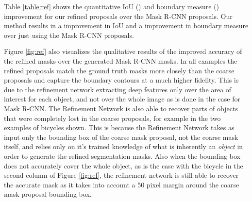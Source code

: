 \documentclass[runningheads]{llncs}
\begin{document}
Table \ref{table:ref} shows the quantitative IoU () and boundary measure () improvement for our refined proposals over the Mask R-CNN proposals. Our method results in a  improvement in IoU and a  improvement in boundary measure over just using the Mask R-CNN proposals.

Figure \ref{fig:ref} also visualizes the qualitative results of the improved accuracy of the refined masks over the generated Mask R-CNN masks. In all examples the refined proposals match the ground truth masks more closely than the coarse proposals and capture the boundary contours at a much higher fidelity. This is due to the refinement network extracting deep features only over the area of interest for each object, and not over the whole image as is done in the case for Mask R-CNN. The Refinement Network is also able to recover parts of objects that were completely lost in the coarse proposals, for example in the two examples of bicycles shown. This is because the Refinement Network takes as input only the bounding box of the coarse mask proposal, not the coarse mask itself, and relies only on it's trained knowledge of what is inherently an \textit{object} in order to generate the refined segmentation masks. Also when the bounding box does not accurately cover the whole object, as is the case with the bicycle in the second column of Figure \ref{fig:ref}, the refinement network is still able to recover the accurate mask as it takes into account a 50 pixel margin around the coarse mask proposal bounding box.
\end{document}
